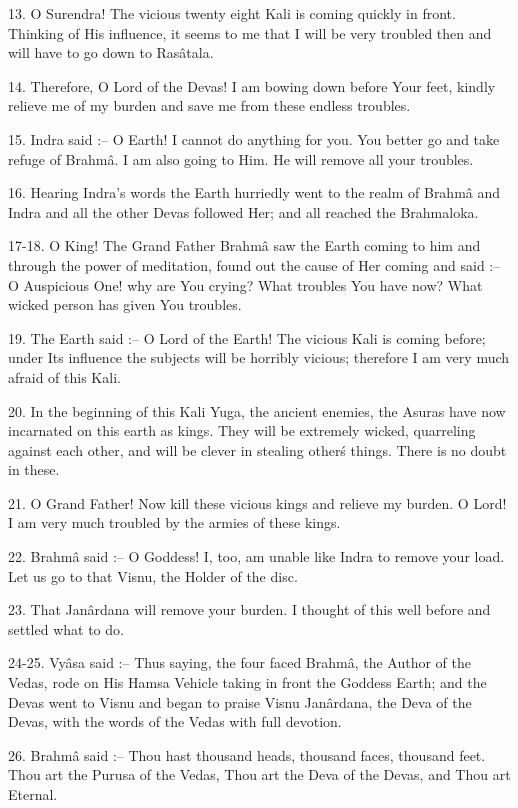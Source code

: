13. O Surendra! The vicious twenty eight Kali is coming quickly in front. Thinking of His influence, it seems to me that I will be very troubled then and will have to go down to Ras\^atala.

14. Therefore, O Lord of the Devas! I am bowing down before Your feet, kindly relieve me of my burden and save me from these endless troubles.

15. Indra said :-- O Earth! I cannot do anything for you. You better go and take refuge of Brahm\^a. I am also going to Him. He will remove all your troubles.

16. Hearing Indra's words the Earth hurriedly went to the realm of Brahm\^a and Indra and all the other Devas followed Her; and all reached the Brahmaloka.

17-18. O King! The Grand Father Brahm\^a saw the Earth coming to him and through the power of meditation, found out the cause of Her coming and said :-- O Auspicious One! why are You crying? What troubles You have now? What wicked person has given You troubles.

19. The Earth said :-- O Lord of the Earth! The vicious Kali is coming before; under Its influence the subjects will be horribly vicious; therefore I am very much afraid of this Kali.

20. In the beginning of this Kali Yuga, the ancient enemies, the Asuras have now incarnated on this earth as kings. They will be extremely wicked, quarreling against each other, and will be clever in stealing other\'s things. There is no doubt in these.

21. O Grand Father! Now kill these vicious kings and relieve my burden. O Lord! I am very much troubled by the armies of these kings.

22. Brahm\^a said :-- O Goddess! I, too, am unable like Indra to remove your load. Let us go to that Visnu, the Holder of the disc.

23. That Jan\^ardana will remove your burden. I thought of this well before and settled what to do.

24-25. Vy\^asa said :-- Thus saying, the four faced Brahm\^a, the Author of the Vedas, rode on His Hamsa Vehicle taking in front the Goddess Earth; and the Devas went to Visnu and began to praise Visnu Jan\^ardana, the Deva of the Devas, with the words of the Vedas with full devotion.

26. Brahm\^a said :-- Thou hast thousand heads, thousand faces, thousand feet. Thou art the Purusa of the Vedas, Thou art the Deva of the Devas, and Thou art Eternal.

